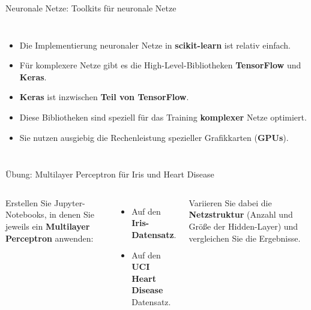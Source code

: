 \begin{frame}{Neuronale Netze: Toolkits für neuronale Netze}
\begin{columns}
\centering


\vspace{1.2em}


\begin{itemize}
  \item Die Implementierung neuronaler Netze in \textbf{scikit-learn} ist
        relativ einfach.
  \item Für komplexere Netze gibt es die High-Level-Bibliotheken
        \textbf{TensorFlow} und \textbf{Keras}.
  \item \textbf{Keras} ist inzwischen \textbf{Teil von TensorFlow}.
  \item Diese Bibliotheken sind speziell für das Training \textbf{komplexer}
        Netze optimiert.
  \item Sie nutzen ausgiebig die Rechenleistung spezieller Grafikkarten
        (\textbf{GPUs}).
\end{itemize}
\end{columns}
\end{frame}


\begin{frame}{Übung: Multilayer Perceptron für Iris und Heart Disease}
\begin{columns}
Erstellen Sie Jupyter-Notebooks, in denen Sie jeweils ein \textbf{Multilayer
Perceptron} anwenden:

\begin{itemize}
  \item Auf den \textbf{Iris-Datensatz}.
  \item Auf den \textbf{UCI Heart Disease} Datensatz.
\end{itemize}

\vspace{0.4em}
Variieren Sie dabei die \textbf{Netzstruktur} (Anzahl und Größe der
Hidden-Layer) und vergleichen Sie die Ergebnisse.

\centering
{}
\end{columns}
\end{frame}

\makequestionspage{\FRAGENIMAGE}